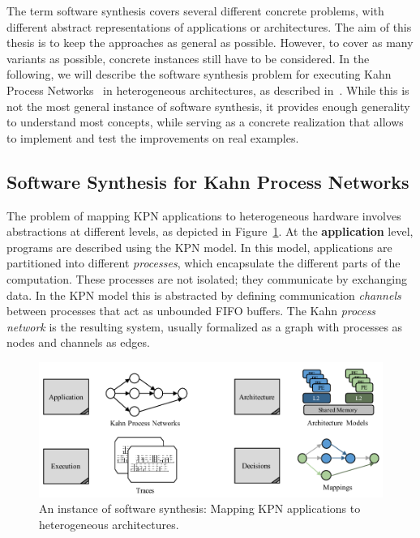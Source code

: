\documentclass[sigplan,10pt]{acmart}
\begin{document}
The term software synthesis covers several different concrete problems, with different abstract representations of applications or architectures.
The aim of this thesis is to keep the approaches as general as possible. However, to cover as many variants as possible, concrete instances still have to be considered.
In the following, we will describe the software synthesis problem for executing Kahn Process Networks~\cite{kahn74} in heterogeneous architectures, as described in~\cite{castrillon14_springer}.
While this is not the most general instance of software synthesis, it provides enough generality to understand most concepts, while serving as a concrete realization that allows to implement and test the improvements on real examples.

\subsection{Software Synthesis for Kahn Process Networks}

The problem of mapping KPN applications to heterogeneous hardware involves abstractions at different levels, as depicted in Figure~\ref{fig:problem}.
At the \textbf{application} level, programs are described using the KPN model. In this model, applications are partitioned into
different \emph{processes}, which encapsulate the different parts of the computation. These processes are not isolated;
they communicate by exchanging data. In the KPN model this is abstracted by defining communication \emph{channels}
between processes that act as unbounded FIFO buffers. The Kahn \emph{process network} is the resulting system, usually formalized as a graph 
with processes as nodes and channels as edges.

 \begin{figure}
 	\centering
 	\includegraphics[width=.48\textwidth]{figures/problem.pdf} 
 	\caption{An instance of software synthesis: Mapping KPN applications to heterogeneous architectures.}
 	\label{fig:problem}
 		\vspace{-3mm}
 \end{figure}
\end{document}

